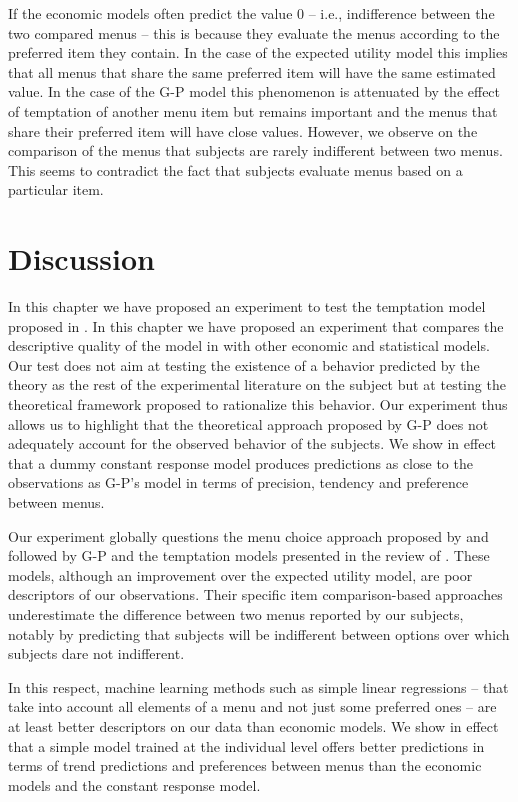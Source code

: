 \documentclass[
]{book}
\begin{document}
If the economic models often predict the value 0 -- i.e., indifference between
the two compared menus -- this is because they evaluate the
menus according to the preferred item they contain.
In the case of the expected utility model this implies that all menus that share the
same preferred item will have the same estimated value.
In the case of the G-P model this phenomenon is attenuated by the effect of
temptation of another menu item but remains important and the menus that share
their preferred item will have close values.
However, we observe on the comparison of the menus that subjects are rarely
indifferent between two menus.
This seems to contradict the fact that subjects evaluate menus based on a
particular item.

\hypertarget{discu3}{%
\section{Discussion}\label{discu3}}

In this chapter we have proposed an experiment to test the temptation model
proposed in \citet{gul2001temptation}.
In this chapter we have proposed an experiment that compares the descriptive
quality of the model in \citet{gul2001temptation} with other economic and statistical
models.
Our test does not aim at testing the existence of a behavior predicted by the
theory as the rest of the experimental literature on the subject but at testing
the theoretical framework proposed to rationalize this behavior.
Our experiment thus allows us to highlight that the theoretical approach
proposed by G-P does not adequately account for the observed behavior of the
subjects.
We show in effect that a dummy constant response model produces predictions as
close to the observations as G-P's model in terms of precision, tendency and
preference between menus.

Our experiment globally questions the menu choice approach proposed by
\citet{kreps1979representation} and followed by G-P and the temptation models presented
in the review of \citet{lipman2013temptation}.
These models, although an improvement over the expected utility model, are poor
descriptors of our observations.
Their specific item comparison-based approaches underestimate the
difference between two menus reported by our subjects, notably by predicting
that subjects will be indifferent between options over which subjects dare not indifferent.

In this respect, machine learning methods such as simple linear regressions -- that take into account all elements of a menu and not just some preferred ones -- are at least
better descriptors on our data than economic models.
We show in effect that a simple model trained at the individual level offers
better predictions in terms of trend predictions and preferences between menus
than the economic models and the constant response model.
\end{document}
